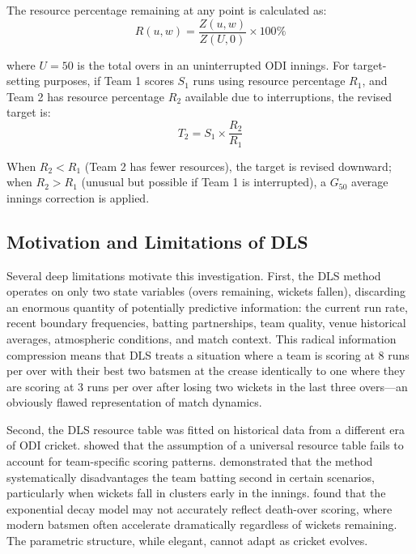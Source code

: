 \documentclass[10pt,a4paper,twocolumn]{article}
\begin{document}
The resource percentage remaining at any point is calculated as:
\begin{equation}
R(u, w) = \frac{Z(u, w)}{Z(U, 0)} \times 100\%
\end{equation}

\noindent where $U = 50$ is the total overs in an uninterrupted ODI innings. For target-setting purposes, if Team 1 scores $S_1$ runs using resource percentage $R_1$, and Team 2 has resource percentage $R_2$ available due to interruptions, the revised target is:
\begin{equation}
T_2 = S_1 \times \frac{R_2}{R_1}
\end{equation}

When $R_2 < R_1$ (Team 2 has fewer resources), the target is revised downward; when $R_2 > R_1$ (unusual but possible if Team 1 is interrupted), a $G_{50}$ average innings correction is applied.

\subsection{Motivation and Limitations of DLS}

Several deep limitations motivate this investigation. First, the DLS method operates on only two state variables (overs remaining, wickets fallen), discarding an enormous quantity of potentially predictive information: the current run rate, recent boundary frequencies, batting partnerships, team quality, venue historical averages, atmospheric conditions, and match context. This radical information compression means that DLS treats a situation where a team is scoring at 8 runs per over with their best two batsmen at the crease identically to one where they are scoring at 3 runs per over after losing two wickets in the last three overs---an obviously flawed representation of match dynamics.

Second, the DLS resource table was fitted on historical data from a different era of ODI cricket. \citet{mchale2011modelling} showed that the assumption of a universal resource table fails to account for team-specific scoring patterns. \citet{bhattacharya2011revised} demonstrated that the method systematically disadvantages the team batting second in certain scenarios, particularly when wickets fall in clusters early in the innings. \citet{carter2005model} found that the exponential decay model may not accurately reflect death-over scoring, where modern batsmen often accelerate dramatically regardless of wickets remaining. The parametric structure, while elegant, cannot adapt as cricket evolves.
\end{document}
